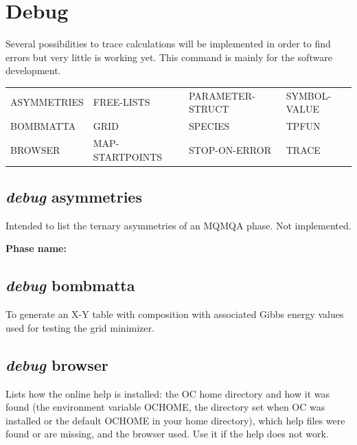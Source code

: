 \documentclass[11pt]{article}
\begin{document}
\hypertarget{Debug}{}
\section{Debug }

Several possibilities to trace calculations will be implemented in
order to find errors but very little is working yet.  This command is
mainly for the software development.

{\small
\begin{tabular}{llll}
ASYMMETRIES  & FREE-LISTS       & PARAMETER-STRUCT~ & SYMBOL-VALUE \\
BOMBMATTA    & GRID             & SPECIES          & TPFUN \\
BROWSER      & MAP-STARTPOINTS~ & STOP-ON-ERROR~   & TRACE   \\
\end{tabular}
}

\hypertarget{Debug asymmetry}{}
\subsection{{\em debug} asymmetries}

Intended to list the ternary asymmetries of an MQMQA phase.  Not
implemented.

{\bf Phase name:}

\hypertarget{Debug bombmatta}{}
\subsection{{\em debug} bombmatta}

To generate an X-Y table with composition with associated Gibbs energy values
used for testing the grid minimizer.

\hypertarget{Debug browser}{}
\subsection{{\em debug} browser}

Lists how the online help is installed: the OC home directory and
how it was found (the environment variable OCHOME, the directory set
when OC was installed or the default OCHOME in your home directory),
which help files were found or are missing, and the browser used.
Use it if the help does not work.
\end{document}
